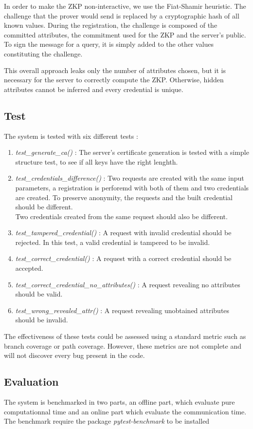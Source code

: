 \documentclass[10pt,conference,compsocconf]{IEEEtran}
\begin{document}
In order to make the ZKP non-interactive, we use the Fiat-Shamir heuristic. The challenge that the prover would send is replaced by a cryptographic hash of all known values. During the registration, the challenge is composed of the committed attributes, the commitment used for the ZKP and the server's public. To sign the message for a query, it is simply added to the other values constituting the challenge. 

This overall approach leaks only the number of attributes chosen, but it is necessary for the server to correctly compute the ZKP. Otherwise, hidden attributes cannot be inferred and every credential is unique.

\subsection{Test}
The system is tested with six different tests : 
\begin{enumerate}
    \item \textit{test\_generate\_ca()} : The server's certificate generation is tested with a simple structure test, to see if all keys have the right lenghth.
    \item \textit{test\_credentials\_difference()} : Two requests are created with the same input parameters, a registration is perforemd with both of them and two credentials are created. To preserve anonymity, the requests and the built credential should be different. \\ Two credentials created from the same request should also be different.
    \item \textit{test\_tampered\_credential()} : A request with invalid credential should be rejected. In this test, a valid credential is tampered to be invalid.
    \item \textit{test\_correct\_credential()} : A request with a correct credential should be accepted.
    \item \textit{test\_correct\_credential\_no\_attributes()} : A request revealing no attributes should be valid.
    \item \textit{test\_wrong\_revealed\_attr()} : A request revealing unobtained attributes should be invalid.
\end{enumerate}
The effectiveness of these tests could be assessed using a standard metric such as branch coverage or path coverage. However, these metrics are not complete and will not discover every bug present in the code.


\subsection{Evaluation}
The system is benchmarked in two parts, an offline part, which evaluate pure computationnal time and an online part which evaluate the communication time. The benchmark require the package \textit{pytest-benchmark} to be installed
\end{document}
